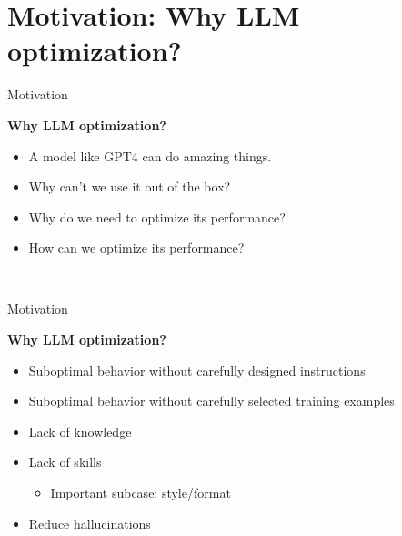 \documentclass[11pt,compress,t,notes=noshow, xcolor=table]{beamer}
\begin{document}

%









\section{Motivation: Why LLM optimization?}

\begin{vbframe}{Motivation}

\vfill

\textbf{Why LLM optimization?}

	\begin{itemize}
		\item A model like GPT4 can do amazing
		things.
                \item Why can't we use it out of the box?
                \item Why do we need to optimize its performance?
                \item How can we  optimize its performance?
	\end{itemize}

\vfill

\end{vbframe}

\newpage

\

\newpage

\begin{vbframe}{Motivation}

\vfill

\textbf{Why LLM optimization?}

	\begin{itemize}
                \item Suboptimal behavior without carefully
		designed instructions
                \item Suboptimal behavior without carefully
		selected training examples
		\item Lack of knowledge
                \item Lack of skills
	\begin{itemize}
        \item Important subcase: style/format
	\end{itemize}
                \item Reduce hallucinations
	\end{itemize}

\vfill

\end{vbframe}
\end{document}
